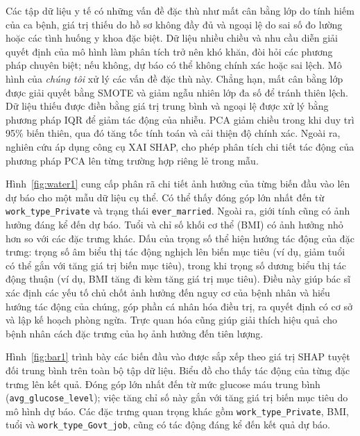 Các tập dữ liệu y tế có những vấn đề đặc thù như mất cân bằng lớp do tính hiếm của ca bệnh, giá trị thiếu do hồ sơ không đầy đủ và ngoại lệ do sai số đo lường hoặc các tình huống y khoa đặc biệt. Dữ liệu nhiều chiều và nhu cầu diễn giải quyết định của mô hình làm phân tích trở nên khó khăn, đòi hỏi các phương pháp chuyên biệt; nếu không, dự báo có thể không chính xác hoặc sai lệch. Mô hình của \textit{chúng tôi} xử lý các vấn đề đặc thù này. Chẳng hạn, mất cân bằng lớp được giải quyết bằng SMOTE và giảm ngẫu nhiên lớp đa số để tránh thiên lệch. Dữ liệu thiếu được điền bằng giá trị trung bình và ngoại lệ được xử lý bằng phương pháp IQR để giảm tác động của nhiễu. PCA giảm chiều trong khi duy trì 95\% biến thiên, qua đó tăng tốc tính toán và cải thiện độ chính xác. Ngoài ra, nghiên cứu áp dụng công cụ XAI SHAP, cho phép phân tích chi tiết tác động của phương pháp PCA lên từng trường hợp riêng lẻ trong mẫu.

Hình~\ref{fig:water1} cung cấp phân rã chi tiết ảnh hưởng của từng biến đầu vào lên dự báo cho một mẫu dữ liệu cụ thể. Có thể thấy đóng góp lớn nhất đến từ \texttt{work\_type\_Private} và trạng thái \texttt{ever\_married}. Ngoài ra, giới tính cũng có ảnh hưởng đáng kể đến dự báo. Tuổi và chỉ số khối cơ thể (BMI) có ảnh hưởng nhỏ hơn so với các đặc trưng khác. Dấu của trọng số thể hiện hướng tác động của đặc trưng: trọng số âm biểu thị tác động nghịch lên biến mục tiêu (ví dụ, giảm tuổi có thể gắn với tăng giá trị biến mục tiêu), trong khi trọng số dương biểu thị tác động thuận (ví dụ, BMI tăng đi kèm tăng giá trị mục tiêu). Điều này giúp bác sĩ xác định các yếu tố chủ chốt ảnh hưởng đến nguy cơ của bệnh nhân và hiểu hướng tác động của chúng, góp phần cá nhân hóa điều trị, ra quyết định có cơ sở và lập kế hoạch phòng ngừa. Trực quan hóa cũng giúp giải thích hiệu quả cho bệnh nhân cách đặc trưng của họ ảnh hưởng đến tiên lượng.


Hình~\ref{fig:bar1} trình bày các biến đầu vào được sắp xếp theo giá trị SHAP tuyệt đối trung bình trên toàn bộ tập dữ liệu. Biểu đồ cho thấy tác động của từng đặc trưng lên kết quả. Đóng góp lớn nhất đến từ mức glucose máu trung bình (\texttt{avg\_glucose\_level}); việc tăng chỉ số này gắn với tăng giá trị biến mục tiêu do mô hình dự báo. Các đặc trưng quan trọng khác gồm \texttt{work\_type\_Private}, BMI, tuổi và \texttt{work\_type\_Govt\_job}, cũng có tác động đáng kể đến kết quả dự báo.

